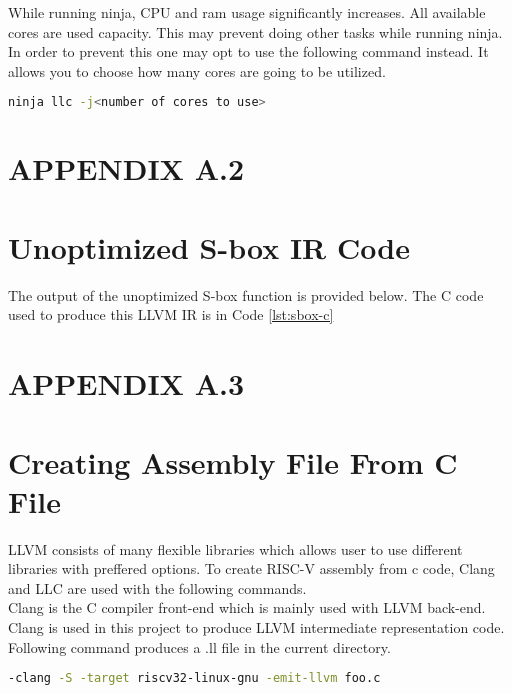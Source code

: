 While running ninja, CPU and ram usage significantly increases. All available cores are used capacity. This may prevent doing other tasks while running ninja. In order to prevent this one may opt to use the following command instead. It allows you to choose how many cores are going to be utilized.
\begin{lstlisting}[language=Bash]
	ninja llc -j<number of cores to use>
\end{lstlisting}


\section*{APPENDIX A.2}
\renewcommand{\theequation}{A.2.\arabic{equation}}
\setcounter{equation}{0}
\section{Unoptimized S-box IR Code}
The output of the unoptimized S-box function is provided below. The C code used to produce this LLVM IR is in Code \ref{lst:sbox-c}



\newpage

\section*{APPENDIX A.3}
\renewcommand{\theequation}{A.2.\arabic{equation}}
\setcounter{equation}{0}

\section{Creating Assembly File From C File}

LLVM consists of many flexible libraries which allows user to use different libraries with preffered  options. To create RISC-V assembly from c code, Clang and LLC are used with the following commands. \\

Clang is the C compiler front-end which is mainly used with LLVM back-end. Clang is used in this project to produce LLVM intermediate representation code. Following command produces a .ll file in the current directory. 

\begin{lstlisting}[language=Bash]
-clang -S -target riscv32-linux-gnu -emit-llvm foo.c
\end{lstlisting}

